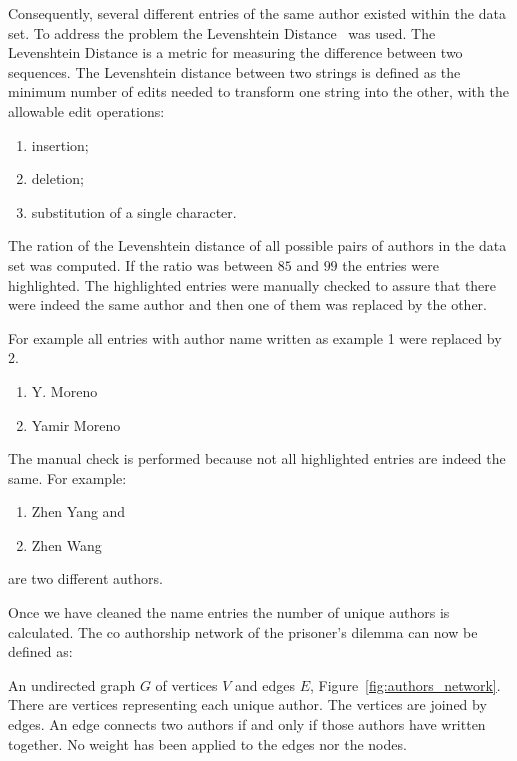 \documentclass{article}
\newcommand{\authors}{}
\newcommand{\edges}{}
\begin{document}
Consequently, several different entries of the same author existed within the data
set. To address the problem the Levenshtein Distance~\cite{miller2009} was used.
The Levenshtein Distance is a metric for measuring the difference between two
sequences. The Levenshtein distance between two strings is defined as the
minimum number of edits needed to transform one string into the other, with the
allowable edit operations:

\begin{enumerate}
    \item insertion;
    \item deletion;
    \item substitution of a single character.
\end{enumerate}

The ration of the Levenshtein distance of all possible pairs of authors in the
data set was computed. If the ratio was between \(85\) and \(99\) the entries were
highlighted. The highlighted entries were manually checked to assure that there
were indeed the same author and then one of them was replaced by the other.

For example all entries with author name written as example 1 were replaced by
2.

\begin{enumerate}
    \item Y. Moreno
    \item Yamir Moreno
\end{enumerate}

The manual check is performed because not all highlighted entries are indeed the
same. For example:

\begin{enumerate}
    \item Zhen Yang and
    \item Zhen Wang
\end{enumerate}

are two different authors.

Once we have cleaned the name entries the number of unique authors is calculated.
The co authorship network of the prisoner's dilemma can now be defined as:

An undirected graph \(G\) of vertices \(V\) and edges \(E\), Figure~\ref{fig:authors_network}.
There are \authors vertices representing each unique author. The vertices are
joined by \edges edges. An edge connects two authors if and only if those authors
have written together. No weight has been applied to the edges nor the nodes.
\end{document}
